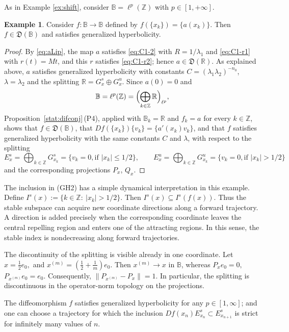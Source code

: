 \documentclass[12pt]{article}
\newcommand{\Bb}{\mathbb{B}}
\newcommand{\Zz}{\mathbb{Z}}
\newcommand{\Rr}{\mathbb{R}}
\newcommand{\DUC}{\mathfrak{D}}
\theoremstyle{definition}
\newtheorem{example}[thm]{Example}
\begin{document}
As in Example \ref{ex:shift}, consider $\Bb = \ell^p(\Zz)$ with $p \in [1, +\infty]$.
\begin{example}\label{ex:product}
    Consider $f:\Bb \to \Bb$ defined by
    $
    f(\{x_k\}) = \{a(x_k)\}.
    $
    Then $f \in \DUC(\Bb)$ and satisfies generalized hyperbolicity. 
\end{example}
\begin{proof}
By \eqref{eq:aLip}, the map $a$ satisfies \eqref{eq:C1-2} with $R = 1/\lambda_1$ and \eqref{eq:C1-r1} with $r(t) = Mt$, and this $r$ satisfies \eqref{eq:C1-r2}; hence $a \in \DUC(\Rr)$. As explained above, $a$ satisfies generalized hyperbolicity with constants $C = (\lambda_1\lambda_2)^{-n_0}$, $\lambda = \lambda_2$ and the splitting $\Rr = G^s_x \oplus G^u_x$. Since $a(0) = 0$ and
$$
\Bb = \ell^p(\Zz) = \Bigl(\bigoplus_{k \in \Zz} \Rr\Bigr)_{\ell^p},
$$
Proposition~\ref{stat:difconj}\,{\rm(P4)}, applied with $\Bb_k = \Rr$ and $f_k = a$ for every $k \in \Zz$, shows that $f \in \DUC(\Bb)$, that $Df(\{x_k\})\{v_k\} = \{a'(x_k)v_k\}$, and that $f$ satisfies generalized hyperbolicity with the same constants $C$ and $\lambda$, with respect to the splitting
$$
E^s_x = \bigoplus_{k \in \Zz} G_{x_k}^s = \{v_k = 0, \mbox{if $|x_k| \leq 1/2$}\},
\qquad
E^u_x = \bigoplus_{k \in \Zz} G_{x_k}^u = \{v_k = 0, \mbox{if $|x_k| > 1/2$}\}
$$
and the corresponding projections $P_x$, $Q_x$.
\end{proof}


The inclusion in {\rm(GH2)} has a simple dynamical interpretation in
this example. Define
$
I^s(x):=\{k\in\Zz:\ |x_k|>1/2\}.
$
Then
$
I^s(x)\subseteq I^s(f(x)).
$
Thus the stable subspace can acquire new coordinate directions along a
forward trajectory. A direction is added precisely when the
corresponding coordinate leaves the central repelling region and enters
one of the attracting regions. In this sense, the stable index is
nondecreasing along forward trajectories.

The discontinuity of the splitting is visible already in one coordinate.
Let
$
x=\frac12e_0,
$
and $x^{(m)}=\left(\frac12+\frac1m\right)e_0$. Then $x^{(m)}\to x$ in $\Bb$, whereas
$
P_xe_0=0,$
$P_{x^{(m)}}e_0=e_0$.
Consequently,
$
\|P_{x^{(m)}}-P_x\|=1.
$
In particular, the splitting is discontinuous in the operator-norm
topology on the projections.

The diffeomorphism $f$ satisfies generalized hyperbolicity for any $p \in [1, \infty]$;
and one can choose a trajectory for which the inclusion
$
Df(x_n)E^s_{x_n}\subset E^s_{x_{n+1}}
$
is strict for infinitely many values of $n$. 
\end{document}

